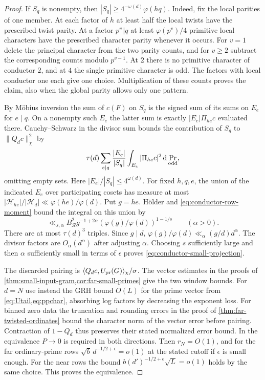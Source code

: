 \documentclass[11pt,a4paper]{article}
\numberwithin{equation}{section}
\newcommand{\ud}{\mathrm d}
\begin{document}
\begin{proof}
If $S_q$ is nonempty, then $|S_q|\ge4^{-\omega(d)}\varphi(hq)$.
Indeed, fix the local parities of one member. At each factor of
$h$ at least half the local twists have the prescribed twist
parity. At a factor $p^v\Vert q$ at least $\varphi(p^v)/4$
primitive local characters have the prescribed character parity
whenever it occurs. For $v=1$ delete the principal character
from the two parity counts, and for $v\ge2$ subtract the
corresponding counts modulo $p^{v-1}$. At $2$ there is no
primitive character of conductor $2$, and at $4$ the single
primitive character is odd. The factors with local conductor
one each give one choice. Multiplication of these counts proves
the claim, also when the global parity allows only one pattern.

By M\"obius inversion the sum of $c(F)$ on $S_q$ is the signed
sum of its sums on $E_e$ for $e\mid q$. On a nonempty such
$E_e$ the latter sum is exactly $|E_e|\Pi_{he}c$ evaluated there.
Cauchy--Schwarz in the divisor sum bounds the contribution of
$S_q$ to $\|Q_dc\|_\chi^2$ by
\[
 \tau(d)\sum_{e\mid q}\frac{|E_e|}{|S_q|}
          \int_{E_e}|\Pi_{he}c|^2\,\ud\Pr_{\rm odd},
\]
omitting empty sets. Here $|E_e|/|S_q|\le4^{\omega(d)}$.
For fixed $h,q,e$, the union of the indicated $E_e$ over
participating cosets has measure at most
$|\mathcal H_{he}|/|\mathcal H_d|\ll\varphi(he)/\varphi(d)$.
Put $g=he$. H\"older and \eqref{eq:conductor-row-moment} bound
the integral on this union by
\[
 \ll_{s,\alpha} B_{\mathcal R}^2 g^{-1+2\alpha}
                   (\varphi(g)/\varphi(d))^{1-1/s}
 \qquad(\alpha>0).
\]
There are at most $\tau(d)^3$ triples. Since $g\mid d$,
$\varphi(g)/\varphi(d)\ll_\alpha (g/d)d^\alpha$.
The divisor factors are $O_\alpha(d^\alpha)$ after adjusting
$\alpha$. Choosing $s$ sufficiently large and then $\alpha$
sufficiently small in terms of $\epsilon$ proves
\eqref{eq:conductor-small-projection}.

The discarded pairing is $\langle Q_dc,U_{\rm pr}(G)\rangle_\chi
/\sigma$. The vector estimates in the proofs of
\cref{thm:small-input-gram,cor:far-small-primes} give the two
window bounds. For $d=N$ use instead the GRH bound $O(L)$ for
the prime vector from \cref{eq:Utail,eq:ppchar}, absorbing log
factors by decreasing the exponent loss. For binned zero data
the truncation and rounding errors in the proof of
\cref{thm:far-twisted-ordinates} bound the character norm of the
vector error before pairing. Contraction of $1-Q_d$ thus preserves
their stated normalized error bound. In the equivalence $P\to0$
is required in both directions. Then $r_N=O(1)$, and for the
far ordinary-prime rows $\sqrt b\,d^{-1/2+\epsilon}=o(1)$ at
the stated cutoff if $\epsilon$ is small enough. For the near
rows the bound $b(d')^{-1/2+\epsilon}\sqrt L=o(1)$ holds by
the same choice. This proves the equivalence.
\end{proof}
\end{document}
